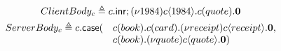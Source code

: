 \begin{gather*}
ClientBody_c \triangleq
     {{c}.\mathsf{inr};{(\nu{1984}){c}\langle{1984}\rangle.{{c}({quote}).{\mathbf{0}}}}}\\
\begin{array}{ll}
ServerBody_c \triangleq c.\mathsf{case}(&{c}({book}).{{c}({card}).{(\nu{receipt}){c}\langle{receipt}\rangle.{\mathbf{0}}}},\\
                                    & {c}({book}).{(\nu{quote}){c}\langle{quote}\rangle.{\mathbf{0}}})
\end{array}
\end{gather*}
